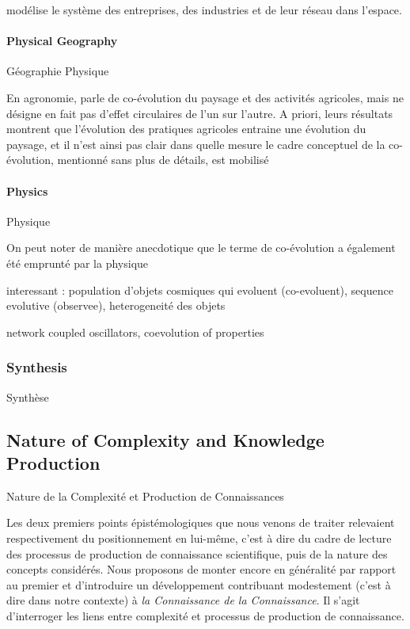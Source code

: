 \cite{ter2011co} modélise le système des entreprises, des industries et de leur réseau dans l'espace.




\paragraph{Physical Geography}{Géographie Physique}

En agronomie, \cite{sheeren2015coevolution} parle de co-évolution du paysage et des activités agricoles, mais ne désigne en fait pas d'effet circulaires de l'un sur l'autre. A priori, leurs résultats montrent que l'évolution des pratiques agricoles entraine une évolution du paysage, et il n'est ainsi pas clair dans quelle mesure le cadre conceptuel de la co-évolution, mentionné sans plus de détails, est mobilisé



\paragraph{Physics}{Physique}

On peut noter de manière anecdotique que le terme de co-évolution a également été emprunté par la physique

\cite{hopkins2008cosmological} interessant : population d'objets cosmiques qui evoluent (co-evoluent), sequence evolutive (observee), heterogeneité des objets

\cite{antonioni2017coevolution} network coupled oscillators, coevolution of properties



\subsubsection{Synthesis}{Synthèse}







\subsection{Nature of Complexity and Knowledge Production}{Nature de la Complexité et Production de Connaissances}


Les deux premiers points épistémologiques que nous venons de traiter relevaient respectivement du positionnement en lui-même, c'est à dire du cadre de lecture des processus de production de connaissance scientifique, puis de la nature des concepts considérés. Nous proposons de monter encore en généralité par rapport au premier et d'introduire un développement contribuant modestement (c'est à dire dans notre contexte) à \emph{la Connaissance de la Connaissance}. Il s'agit d'interroger les liens entre complexité et processus de production de connaissance.



